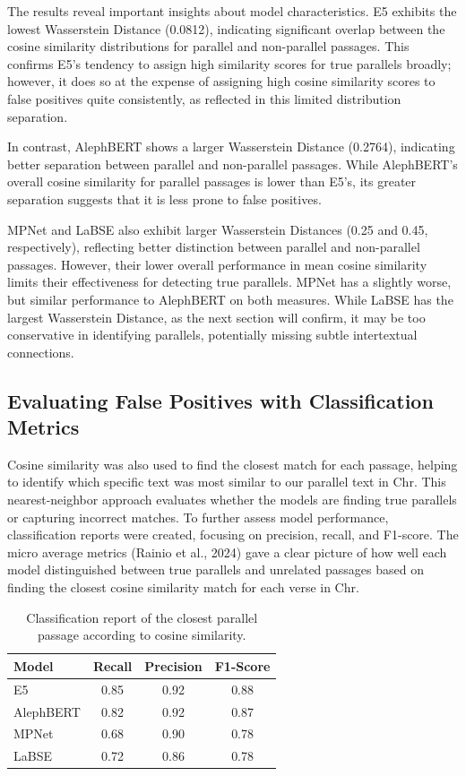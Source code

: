 \documentclass[12pt]{article}
\begin{document}
The results reveal important insights about model characteristics. E5 exhibits the lowest Wasserstein Distance (0.0812), indicating significant overlap between the cosine similarity distributions for parallel and non-parallel passages. This confirms E5's tendency to assign high similarity scores for true parallels broadly; however, it does so at the expense of assigning high cosine similarity scores to false positives quite consistently, as reflected in this limited distribution separation.

In contrast, AlephBERT shows a larger Wasserstein Distance (0.2764), indicating better separation between parallel and non-parallel passages. While AlephBERT’s overall cosine similarity for parallel passages is lower than E5’s, its greater separation suggests that it is less prone to false positives.

MPNet and LaBSE also exhibit larger Wasserstein Distances (0.25 and 0.45, respectively), reflecting better distinction between parallel and non-parallel passages. However, their lower overall performance in mean cosine similarity limits their effectiveness for detecting true parallels. MPNet has a slightly worse, but similar performance to AlephBERT on both measures. While LaBSE has the largest Wasserstein Distance, as the next section will confirm, it may be too conservative in identifying parallels, potentially missing subtle intertextual connections.

\subsection{Evaluating False Positives with Classification Metrics}
Cosine similarity was also used to find the closest match for each passage, helping to identify which specific text was most similar to our parallel text in Chr. This nearest-neighbor approach evaluates whether the models are finding true parallels or capturing incorrect matches. To further assess model performance, classification reports were created, focusing on precision, recall, and F1-score. The micro average metrics (Rainio et al., 2024) gave a clear picture of how well each model distinguished between true parallels and unrelated passages based on finding the closest cosine similarity match for each verse in Chr.

\begin{table}[htbp]
\centering
\label{tab:classification}
\begin{tabular}{@{}lccc@{}}
\toprule
\textbf{Model} & \textbf{Recall} & \textbf{Precision} & \textbf{F1-Score} \\ 
\midrule
E5         & 0.85 & 0.92 & 0.88 \\
AlephBERT  & 0.82 & 0.92 & 0.87 \\
MPNet      & 0.68 & 0.90 & 0.78 \\
LaBSE      & 0.72 & 0.86 & 0.78 \\
\bottomrule
\end{tabular}
\caption{Classification report of the closest parallel passage according to cosine similarity.}
\end{table}
\end{document}

